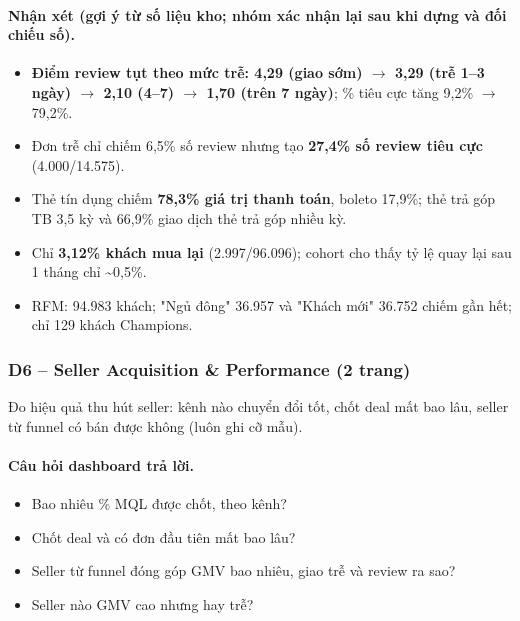 

\paragraph{Nhận xét (gợi ý từ số liệu kho; \textbf{nhóm xác nhận lại sau khi dựng và đối chiếu số}).}

\begin{itemize}
  \item \textbf{Điểm review tụt theo mức trễ: 4,29 (giao sớm) $\rightarrow$ 3,29 (trễ 1–3 ngày) $\rightarrow$ 2,10 (4–7) $\rightarrow$ 1,70 (trên 7 ngày)}; \% tiêu cực tăng 9,2\% $\rightarrow$ 79,2\%.
  \item Đơn trễ chỉ chiếm 6,5\% số review nhưng tạo \textbf{27,4\% số review tiêu cực} (4.000/14.575).
  \item Thẻ tín dụng chiếm \textbf{78,3\% giá trị thanh toán}, boleto 17,9\%; thẻ trả góp TB 3,5 kỳ và 66,9\% giao dịch thẻ trả góp nhiều kỳ.
  \item Chỉ \textbf{3,12\% khách mua lại} (2.997/96.096); cohort cho thấy tỷ lệ quay lại sau 1 tháng chỉ \textasciitilde{}0,5\%.
  \item RFM: 94.983 khách; "Ngủ đông" 36.957 và "Khách mới" 36.752 chiếm gần hết; chỉ 129 khách Champions.
\end{itemize}

\subsubsection*{D6 – Seller Acquisition \& Performance (2 trang)}

Đo hiệu quả thu hút seller: kênh nào chuyển đổi tốt, chốt deal mất bao lâu, seller từ funnel có bán được không (luôn ghi cỡ mẫu).

\paragraph{Câu hỏi dashboard trả lời.}

\begin{itemize}
  \item Bao nhiêu \% MQL được chốt, theo kênh?
  \item Chốt deal và có đơn đầu tiên mất bao lâu?
  \item Seller từ funnel đóng góp GMV bao nhiêu, giao trễ và review ra sao?
  \item Seller nào GMV cao nhưng hay trễ?
\end{itemize}

